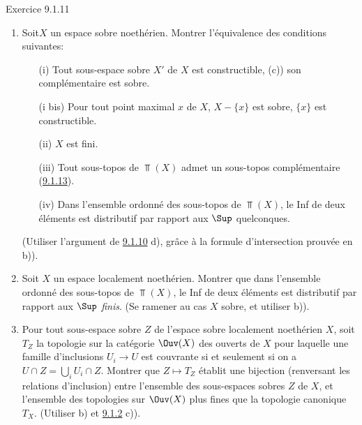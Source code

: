 \documentclass[10pt]{../fichiers-configuration-latex/smfart}
\begin{document}
\begin{enonce*}[remark]{Exercice 9.1.11}
\begin{enumerate}
\begin{enumerate}
\item $X'$ et $X''$ sont sobres.

\item $X'$ est sobre, et le sous-topos $E_{X'}\approxeq \Top(X')$ de
$E=\Top(X)$ admet un sous-topos « complémentaire »  (\cf
{}.

\item L'intersection des sous-topos $E_{X'}\approx\Top(X')$ et
$E_{X''}\approx\Top(X'')$ de $E=\Top(X)$ est le sous-topos
« vide » de $E$.
\end{enumerate}

Montrer que si $E'$ et $E''$ sont deux sous-topos de $E$, ils sont
complémentaires faibles si et seulement si ils sont complémentaires
(\hyperref[IV.exer9.1.13]{9.1.13}).

\item Soit\pageoriginale $X$ un espace sobre noethérien. Montrer
l'équivalence des conditions suivantes:
\begin{itemize}
\item[(i)] Tout sous-espace sobre $X'$ de $X$ est constructible, \ie
(c)) son complémentaire est sobre.

\item[(i bis)] Pour tout point maximal $x$ de $X$, $X-\{x\}$ est
sobre, \ie $\{x\}$ est constructible.

\item[(ii)] $X$ est fini.

\item[(iii)] Tout sous-topos de $\Top(X)$ admet un sous-topos
complémentaire (\cf \hyperref[IV.exer9.1.13]{9.1.13}).

\item[(iv)] Dans l'ensemble ordonné des sous-topos de $\Top(X)$, le
Inf de deux éléments est distributif par rapport aux $\Sup$
quelconques.
\end{itemize}
(Utiliser l'argument de \hyperref[IV.exer9.1.10]{9.1.10} d), grâce à la formule
d'intersection prouvée en b)).

\item Soit $X$ un espace localement noethérien. Montrer que dans
l'ensemble ordonné des sous-topos de $\Top(X)$, le Inf de deux
éléments est distributif par rapport aux $\Sup$ \emph{finis}. (Se
ramener au cas $X$ sobre, et utiliser b)).

\item Pour tout sous-espace sobre $Z$ de l'espace sobre localement
noethérien $X$, soit $T_Z$ la topologie sur la catégorie $\Ouv(X)$
des ouverts de $X$ pour laquelle une famille d'inclusions
$U_i\rightarrow U$ est couvrante si et seulement si on a $U\cap
Z=\bigcup_i U_i \cap Z$. Montrer que $Z\mapsto T_Z$ établit une
bijection (renversant les relations d'inclusion) entre l'ensemble
des sous-espaces sobres $Z$ de $X$, et l'ensemble des topologies sur
$\Ouv(X)$ plus fines que la topologie canonique $T_X$. (Utiliser b)
et \hyperref[IV.rem9.1.2]{9.1.2} c)).


\end{enumerate}
\end{enonce*}
\end{document}
